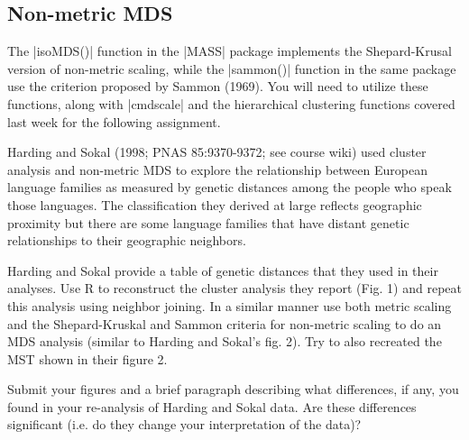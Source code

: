 



\subsection{Non-metric MDS}

The |isoMDS()| function in the |MASS| package implements the Shepard-Krusal version of non-metric scaling, while the |sammon()| function in the same package use the criterion proposed by Sammon (1969). You will need to utilize these functions, along with |cmdscale| and the hierarchical clustering functions covered last week for the following assignment.

\medskip
\begin{assignment}
Harding and Sokal (1998; PNAS 85:9370-9372; see course wiki) used cluster analysis and non-metric MDS to explore the relationship between European language families as measured by genetic distances among the people who speak those languages.  The classification they derived at large reflects geographic proximity but there are some language families that have distant genetic relationships to their geographic neighbors.

\medskip
Harding and Sokal provide a table of genetic distances that they used in their analyses. Use R to reconstruct the cluster analysis they report (Fig. 1) and repeat this analysis using neighbor joining. In a similar manner use both metric scaling and the Shepard-Kruskal and Sammon criteria for non-metric scaling to do an MDS analysis (similar to Harding and Sokal's fig. 2).  Try to also recreated the MST shown in their figure 2.

\medskip
Submit your figures and a brief paragraph describing what differences, if any, you found in your re-analysis of Harding and Sokal data. Are these differences significant (i.e. do they change your interpretation of the data)?

\end{assignment}


